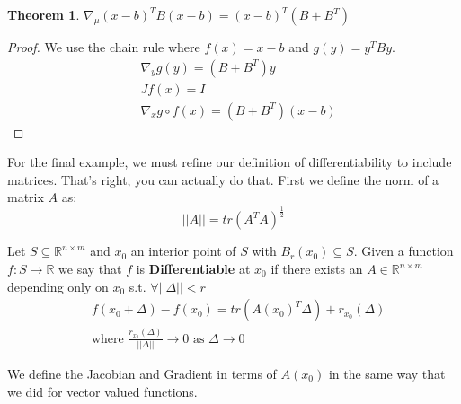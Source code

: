 \documentclass[]{article}
\theoremstyle{mattstyle}
\newtheorem{theorem}{Theorem}[section]
\theoremstyle{definition}
\begin{document}
\begin{theorem}
	$\nabla_{\mu} (x-b)^TB(x-b) = (x-b)^T(B+B^T)$
\end{theorem}
\begin{proof}
	We use the chain rule where $f(x)=x-b$ and $g(y)=y^TBy$.
	\begin{align*}
	&\nabla_{y}g(y) = (B + B^T)y\\
	&Jf(x) = I \\
	&\nabla_{x} g \circ f(x) = (B + B^T)(x-b)
	\end{align*}
\end{proof}

For the final example, we must refine our definition of differentiability to include matrices. That's right, you can actually do that. First we define the norm of a matrix $A$ as:
$$ ||A|| = tr(A^TA)^{\frac{1}{2}} $$

Let $S \subseteq \mathbb{R}^{n \times m}$ and $x_0$ an interior point of $S$ with $B_r(x_0) \subseteq S$. Given a function $f: S \rightarrow \mathbb{R}$ we say that $f$ is \textbf{Differentiable} at $x_0$ if there exists an $A \in \mathbb{R}^{n \times m}$ depending only on $x_0$ s.t. $\forall ||\Delta|| < r$
\begin{align*}
&f(x_0 + \Delta) - f(x_0) = tr(A(x_0)^T\Delta) + r_{x_0}(\Delta)\\
&\text{where $\frac{r_{x_0}(\Delta)}{||\Delta||}\rightarrow 0$ as $\Delta \rightarrow 0$}
\end{align*}

We define the Jacobian and Gradient in terms of $A(x_0)$ in the same way that we did for vector valued functions.

\newpage
\end{document}

